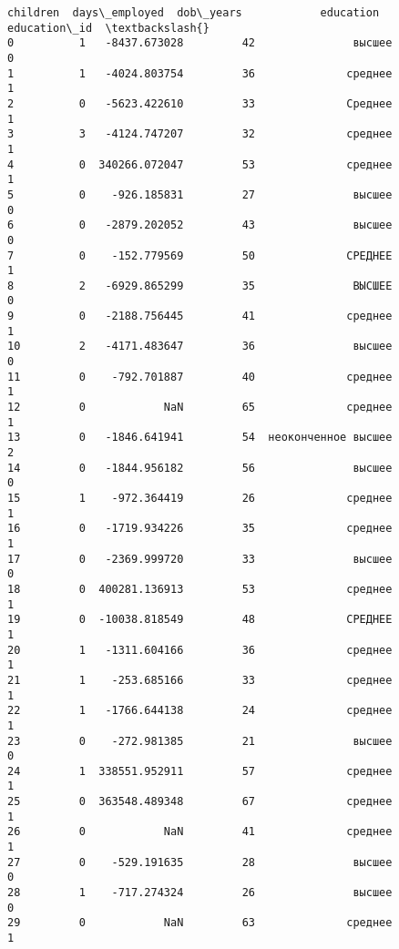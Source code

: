 \documentclass[11pt]{article}
\newcommand{\prompt}[4]{
        \llap{{\color{#2}[#3]: #4}}\vspace{-1.25em}
    }
\begin{document}
            \begin{tcolorbox}[breakable, boxrule=.5pt, size=fbox, pad at break*=1mm, opacityfill=0]
\prompt{Out}{outcolor}{118}{\hspace{3.5pt}}
\begin{Verbatim}[commandchars=\\\{\}]
    children  days\_employed  dob\_years            education  education\_id  \textbackslash{}
0          1   -8437.673028         42               высшее             0
1          1   -4024.803754         36              среднее             1
2          0   -5623.422610         33              Среднее             1
3          3   -4124.747207         32              среднее             1
4          0  340266.072047         53              среднее             1
5          0    -926.185831         27               высшее             0
6          0   -2879.202052         43               высшее             0
7          0    -152.779569         50              СРЕДНЕЕ             1
8          2   -6929.865299         35               ВЫСШЕЕ             0
9          0   -2188.756445         41              среднее             1
10         2   -4171.483647         36               высшее             0
11         0    -792.701887         40              среднее             1
12         0            NaN         65              среднее             1
13         0   -1846.641941         54  неоконченное высшее             2
14         0   -1844.956182         56               высшее             0
15         1    -972.364419         26              среднее             1
16         0   -1719.934226         35              среднее             1
17         0   -2369.999720         33               высшее             0
18         0  400281.136913         53              среднее             1
19         0  -10038.818549         48              СРЕДНЕЕ             1
20         1   -1311.604166         36              среднее             1
21         1    -253.685166         33              среднее             1
22         1   -1766.644138         24              среднее             1
23         0    -272.981385         21               высшее             0
24         1  338551.952911         57              среднее             1
25         0  363548.489348         67              среднее             1
26         0            NaN         41              среднее             1
27         0    -529.191635         28               высшее             0
28         1    -717.274324         26               высшее             0
29         0            NaN         63              среднее             1


\end{Verbatim}
\end{tcolorbox}
\end{document}

